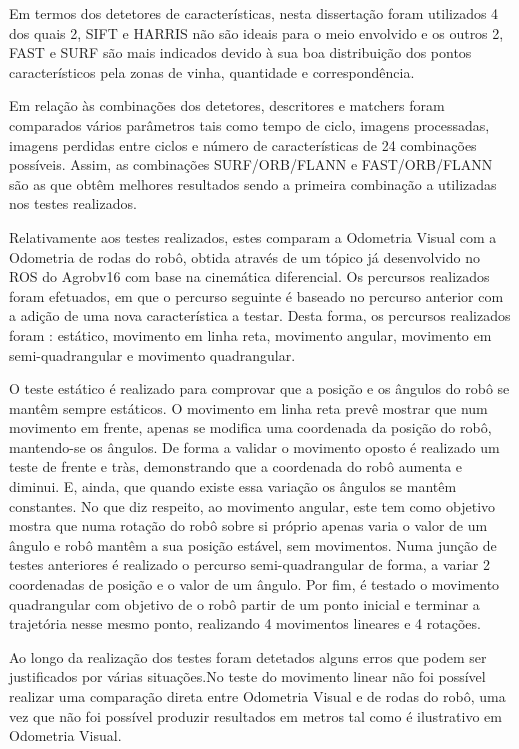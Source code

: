 Em termos dos detetores de características, nesta dissertação foram utilizados 4 dos quais 2, SIFT e HARRIS não são ideais para o meio envolvido e os outros 2, FAST e SURF são mais indicados devido à sua boa distribuição dos pontos característicos pela zonas de vinha, quantidade e correspondência.

Em relação às combinações dos detetores, descritores e matchers foram comparados vários parâmetros tais como tempo de ciclo, imagens processadas, imagens perdidas entre ciclos e número de características de 24 combinações possíveis. Assim, as combinações SURF/ORB/FLANN e FAST/ORB/FLANN são as que obtêm melhores resultados sendo a primeira combinação a utilizadas nos testes realizados.

Relativamente aos testes realizados, estes comparam a Odometria Visual com a Odometria de rodas do robô, obtida através de um tópico já desenvolvido no ROS do Agrobv16 com base na cinemática diferencial. Os percursos realizados foram efetuados, em que o percurso seguinte é baseado no percurso anterior com a adição de uma nova característica a testar. Desta forma, os percursos realizados foram : estático, movimento em linha reta, movimento angular, movimento em semi-quadrangular e movimento quadrangular.


O teste estático é realizado para comprovar que a posição e os ângulos do robô se mantêm sempre estáticos. O movimento em linha reta prevê mostrar que num movimento em frente, apenas se modifica uma coordenada da posição do robô, mantendo-se os ângulos. De forma a validar o movimento oposto é realizado um teste de frente e tràs, demonstrando que a coordenada do robô aumenta e diminui. E, ainda,  que quando existe essa variação os ângulos se mantêm constantes. No que diz respeito, ao movimento angular, este tem como objetivo mostra que numa rotação do robô sobre si próprio apenas varia o valor de um ângulo e robô mantêm a sua posição estável, sem movimentos. Numa junção de testes anteriores é realizado o percurso semi-quadrangular de forma, a variar 2 coordenadas de posição e o valor de um ângulo. Por fim, é testado o movimento quadrangular com objetivo de o robô partir de um ponto inicial e terminar a trajetória nesse mesmo ponto, realizando 4 movimentos lineares e 4 rotações.

 
Ao longo da realização dos testes foram detetados alguns erros que podem ser justificados por várias situações.No teste do movimento linear não foi possível realizar uma comparação direta entre Odometria Visual e de rodas do robô, uma vez que não foi possível produzir resultados em metros tal como é ilustrativo em Odometria Visual.


